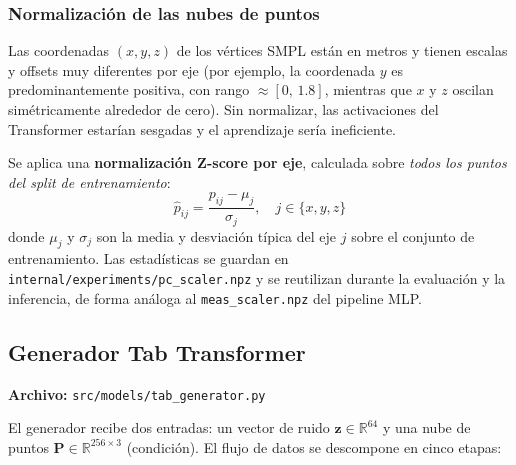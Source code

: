 \documentclass[a4paper,11pt]{article}
\begin{document}
\subsubsection{Normalización de las nubes de puntos}

Las coordenadas $(x,y,z)$ de los vértices SMPL están en metros y tienen
escalas y offsets muy diferentes por eje (por ejemplo, la coordenada $y$
es predominantemente positiva, con rango $\approx[0,\,1.8]$, mientras que
$x$ y $z$ oscilan simétricamente alrededor de cero). Sin normalizar, las
activaciones del Transformer estarían sesgadas y el aprendizaje sería
ineficiente.

Se aplica una \textbf{normalización Z-score por eje}, calculada sobre
\emph{todos los puntos del split de entrenamiento}:
\begin{equation}
    \hat{p}_{ij} = \frac{p_{ij} - \mu_j}{\sigma_j}, \quad j \in \{x,y,z\}
\end{equation}
donde $\mu_j$ y $\sigma_j$ son la media y desviación típica del eje $j$
sobre el conjunto de entrenamiento. Las estadísticas se guardan en
\texttt{internal/experiments/pc\_scaler.npz} y se reutilizan durante la
evaluación y la inferencia, de forma análoga al \texttt{meas\_scaler.npz}
del pipeline MLP.

\subsection{Generador Tab Transformer}

\textbf{Archivo:} \texttt{src/models/tab\_generator.py}

El generador recibe dos entradas: un vector de ruido
$\bm{z}\in\mathbb{R}^{64}$ y una nube de puntos
$\bm{P}\in\mathbb{R}^{256\times3}$ (condición). El flujo de datos se
descompone en cinco etapas:
\end{document}
